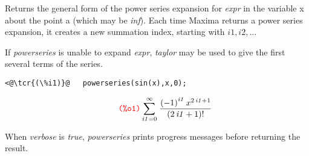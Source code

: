 \documentclass[../Maxima_Workbook.tex]{subfiles}
\begin{document}
\lz {} \hfill \tcr{[function]}

\lz Returns the general form of the power series expansion for \emph{expr} in the variable x about the point a (which may be \emph{inf}). Each time Maxima returns a power series expansion, it creates a new summation index, starting with $ i1, i2, \dots $ 

\lz If \emph{powerseries} is unable to expand \emph{expr}, \emph{taylor} may be used to give the first several terms of the series.

\lz \begin{small}
\color{blue} \leqn
\begin{lstlisting}
<@\tcr{(\%i1)}@   powerseries(sin(x),x,0);
\end{lstlisting}
\vspace{-4mm} \[\tag*{\tcr{\ttfamily (\%o1)}} \sum_{\mathit{i1}=0}^{\infty }{\left. \frac{{{\left( -1\right) }^{\mathit{i1}}}\, {{x}^{2 \, \mathit{i1}+1}}}{\left( 2 \, \mathit{i1}+1\right) !}\right.} \]
\color{black} \reqn
\end{small} \vspace{-2mm} 

\lz When \emph{verbose} is \emph{true}, \emph{powerseries} prints progress messages before returning the result.
\end{document}
